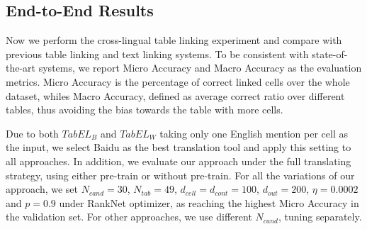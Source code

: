 \subsection{End-to-End Results}
\label{sec:exp-e2e-results}

Now we perform the cross-lingual table linking experiment and compare with
previous table linking and text linking systems.
To be consistent with state-of-the-art systems, we report Micro Accuracy
and Macro Accuracy as the evaluation metrics.
Micro Accuracy is the percentage of correct linked cells over the whole dataset,
whiles Macro Accuracy, defined as average correct ratio over different tables,
thus avoiding the bias towards the table with more cells.


Due to both $TabEL_B$ and $TabEL_W$ taking only one English mention per cell as the input,
we select Baidu as the best translation tool and apply this setting to all approaches.
In addition, we evaluate our approach under the full translating strategy,
using either pre-train or without pre-train.
For all the variations of our approach,
we set $N_{cand}=30$, $N_{tab}=49$, $d_{cell}=d_{cont}=100$, $d_{out}=200$, $\eta=0.0002$ and $p=0.9$ under RankNet optimizer,
as reaching the highest Micro Accuracy in the validation set.
For other approaches, we use different $N_{cand}$, tuning separately.

